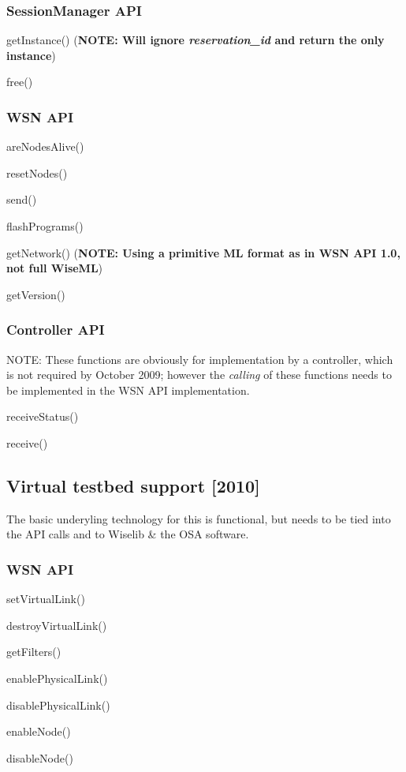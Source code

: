 \subsubsection{SessionManager API}
\begin{list}{}{}
\item getInstance() ({\bf NOTE: Will ignore {\em reservation\_id} and return the only instance})
\item free()
\end{list}

\subsubsection{WSN API}
\begin{list}{}{}
\item areNodesAlive()
\item resetNodes()
\item send()
\item flashPrograms()
\item getNetwork() ({\bf NOTE: Using a primitive ML format as in WSN API 1.0, not full WiseML})
\item getVersion()
\end{list}

\subsubsection{Controller API}
NOTE: These functions are obviously for implementation by a controller, which is not required by October 2009; however the {\em calling} of these functions needs to be implemented in the WSN API implementation.
\begin{list}{}{}
\item receiveStatus()
\item receive()
\end{list}

		\subsection{Virtual testbed support [2010]}
The basic underyling technology for this is functional, but needs to be tied into the API calls and to Wiselib \& the OSA software.

\subsubsection{WSN API}
\begin{list}{}{}
\item setVirtualLink()
\item destroyVirtualLink()
\item getFilters()
\item enablePhysicalLink()
\item disablePhysicalLink()
\item enableNode()
\item disableNode()
\end{list}

